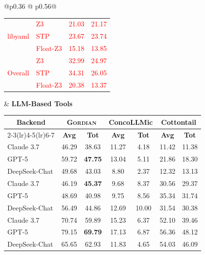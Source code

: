 \documentclass[acmsmall]{acmart}
\newcommand{\rev}[1]{\textcolor{red}{#1}}
\newcommand{\rev}[1]{#1}
\newcommand{\projName}{\textsc{Gordian}\xspace}
\theoremstyle{definition}
\begin{document}
\begin{table}[ht!]
\begin{tabular}{@{}p{}
@{\hspace{0.00\columnwidth}}
p{}@{}}
\begin{tabular}{|l|lcc|}
\multirow{3}{*}{\rev{libyaml}}
 & \rev{Z3}        & \rev{21.03} & \rev{21.17} \\
 & \rev{STP}       & \rev{23.67} & \rev{23.74} \\
 & \rev{Float-Z3}  & \rev{15.18} & \rev{13.85} \\
\midrule
\midrule
\multirow{3}{*}{\rev{Overall}}
& \rev{Z3}        & \rev{32.99} & \rev{24.97} \\
& \rev{STP}       & \rev{34.31} & \rev{26.05} \\
& \rev{Float-Z3}  & \rev{20.38} & \rev{13.37} \\

\bottomrule
\end{tabular}

&
\centering\textbf{LLM-Based Tools}\par\vspace{2pt}
\centering
\begin{tabular}{|l|cc|cc|cc|}
\toprule
\multicolumn{1}{|c|}{\textbf{Backend}}
 & \multicolumn{2}{c|}{\textbf{\projName{}}}
 & \multicolumn{2}{c|}{\textbf{ConcoLLMic}}
 & \multicolumn{2}{c|}{\textbf{Cottontail}} \\
\cmidrule(lr){2-3}\cmidrule(lr){4-5}\cmidrule(lr){6-7}
 & \textbf{Avg} & \textbf{Tot}
 & \textbf{Avg} & \textbf{Tot}
 & \textbf{Avg} & \textbf{Tot} \\
\midrule
Claude 3.7    & 46.29 & 38.63 & 11.27 & 4.18 & 11.42 & 11.38 \\
GPT-5         & 59.72 & \textbf{47.75} & 13.04 & 5.11 & 21.86 & 18.30 \\
DeepSeek-Chat & 49.68 & 43.03 & 8.80 & 2.37 & 12.32 & 13.13 \\
\midrule
Claude 3.7    & 46.19 & \textbf{45.37} & 9.68 & 8.37 & 30.56 & 29.37 \\
GPT-5         & 48.69 & 40.98 & 9.75 & 8.56 & 35.34 & 31.74 \\
DeepSeek-Chat & 56.49 & 44.86 & 12.69 & 10.00 & 31.54 & 30.38 \\
\midrule
Claude 3.7    & 70.74 & 59.89 & 15.23 & 6.37 & 52.10 & 39.46 \\
GPT-5         & 79.15 & \textbf{69.79} & 17.13 & 6.87 & 56.36 & 48.12 \\
DeepSeek-Chat & 65.65 & 62.93 & 11.83 & 4.65 & 54.03 & 46.09 \\


\end{tabular}
\end{tabular}
\end{table}
\end{document}

